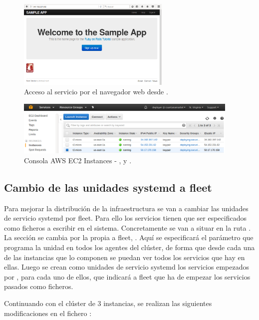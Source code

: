 \begin{figure}[H]
\centering
\includegraphics[width=0.65\textwidth]{images/figures/nav-3.png}
\caption{Acceso al servicio por el navegador web desde .}
\end{figure}

\begin{figure}[H]
\centering
\includegraphics[width=0.95\textwidth]{images/figures/aws-console-3.png}
\caption{Consola AWS EC2 Instances - ,  y .}
\end{figure}

\subsection{Cambio de las unidades systemd a fleet}

Para mejorar la distribución de la infraestructura se van a cambiar las unidades de servicio systemd por fleet. Para ello los servicios tienen que ser especificados como ficheros a escribir en el sistema. Concretamente se van a situar en la ruta . La sección \kode{[Install]} se cambia por la propia a fleet, \kode{[X-Fleet]}. Aquí se especificará el parámetro  que programa la unidad en todos los agentes del clúster, de forma que desde cada una de las instancias que lo componen se puedan ver todos los servicios que hay en ellas. Luego se crean como unidades de servicio systemd los servicios empezados por , para cada uno de ellos, que indicará a fleet que ha de empezar los servicios pasados como ficheros. 

Continuando con el clúster de 3 instancias, se realizan las siguientes modificaciones en el fichero :

